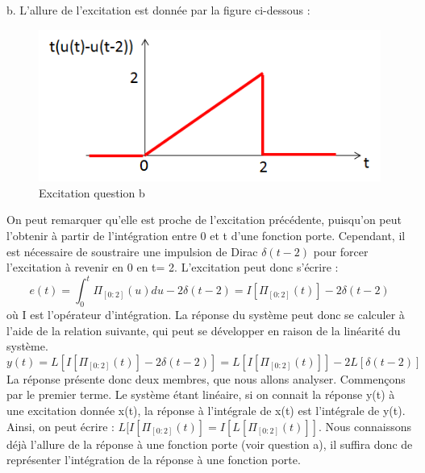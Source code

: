\documentclass[11pt]{report}
\begin{document}
 	b. L'allure de l'excitation est donnée par la figure ci-dessous :
 	\begin{figure}[h!]
 		\centering
 		\includegraphics[scale=0.55]{images/excitation_exo_2_3_b.png} 
 		\caption{Excitation question b}	
 	\end{figure}
 	On peut remarquer qu'elle est proche de l'excitation précédente, puisqu'on peut l'obtenir à partir de l'intégration entre 0 et t d'une fonction porte. Cependant, il est nécessaire de soustraire une impulsion de Dirac $\delta(t-2)$ pour forcer l'excitation à revenir en 0 en t= 2. L'excitation peut donc s'écrire :
 	\begin{equation*}
 	e(t)=\int_{0}^{t}\Pi_{[0:2]}(u)du-2\delta(t-2)=I[\Pi_{[0:2]}(t)]-2\delta(t-2)
 	\end{equation*}
 	où I est l'opérateur d'intégration. La réponse du système peut donc se calculer à l'aide de la relation suivante, qui peut se développer en raison de la linéarité du système.
 	\begin{equation*}
 	y(t)=L[I[\Pi_{[0:2]}(t)]-2\delta(t-2)]=L[I[\Pi_{[0:2]}(t)]]-2L[\delta(t-2)]
 	\end{equation*}
	La réponse présente donc deux membres, que nous allons analyser. Commençons par le premier terme. Le système étant linéaire, si on connait la réponse y(t) à une excitation donnée x(t), la réponse à l'intégrale de x(t) est l'intégrale de y(t). Ainsi, on peut écrire : $ L[I[\Pi_{[0:2]}(t)]=I[L[\Pi_{[0:2]}(t)]]$. Nous connaissons déjà l'allure de la réponse à une fonction porte (voir question a), il suffira donc de représenter l'intégration de la réponse à une fonction porte.
	
\end{document}
